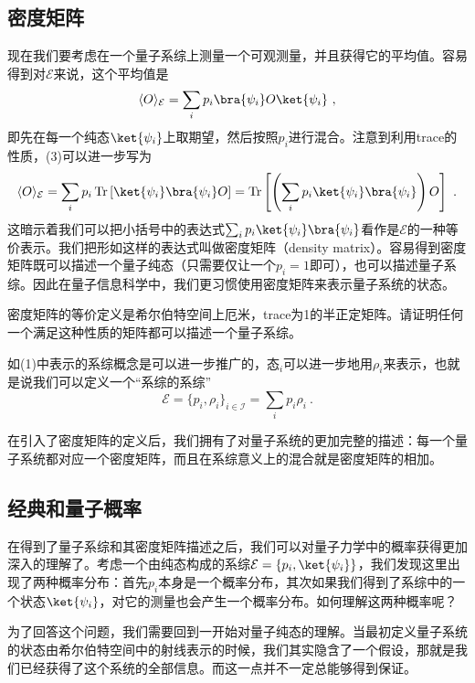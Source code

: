 \subsection{密度矩阵}

现在我们要考虑在一个量子系综上测量一个可观测量，并且获得它的平均值。容易得到对$\mathcal{E}$来说，这个平均值是\begin{equation}
\langle O\rangle_\mathcal{E}=\sum_i p_i\bra{\psi_i}O\ket{\psi_i}~,
\end{equation}
即先在每一个纯态$\ket{\psi_i}$上取期望，然后按照$p_i$进行混合。注意到利用trace的性质，(3)可以进一步写为
\begin{equation}
\langle O\rangle_\mathcal{E}=\sum_i p_i\operatorname{Tr}\left[\ket{\psi_i}\bra{\psi_i}O\right]=\operatorname{Tr}\left[\left(\sum_i p_i\ket{\psi_i}\bra{\psi_i}\right)O\right]~.
\end{equation}
这暗示着我们可以把小括号中的表达式$\sum_i p_i\ket{\psi_i}\bra{\psi_i}$看作是$\mathcal{E}$的一种等价表示。我们把形如这样的表达式叫做密度矩阵（density matrix）。容易得到密度矩阵既可以描述一个量子纯态（只需要仅让一个$p_i=1$即可），也可以描述量子系综。因此在量子信息科学中，我们更习惯使用密度矩阵来表示量子系统的状态。
\begin{exercise}{}
密度矩阵的等价定义是希尔伯特空间上厄米，trace为1的半正定矩阵。请证明任何一个满足这种性质的矩阵都可以描述一个量子系综。
\end{exercise}

如(1)中表示的系综概念是可以进一步推广的，$\text{态}_i$可以进一步地用$\rho_i$来表示，也就是说我们可以定义一个“系综的系综”
\begin{equation}\mathcal{E}=\{p_i,\rho_i\}_{i\in\mathcal{I}}=\sum_i p_i\rho_i~.\end{equation}

在引入了密度矩阵的定义后，我们拥有了对量子系统的更加完整的描述：每一个量子系统都对应一个密度矩阵，而且在系综意义上的混合就是密度矩阵的相加。

\subsection{经典和量子概率}

在得到了量子系综和其密度矩阵描述之后，我们可以对量子力学中的概率获得更加深入的理解了。考虑一个由纯态构成的系综$\mathcal{E}=\{p_i,\ket{\psi_i}\}$，我们发现这里出现了两种概率分布：首先$p_i$本身是一个概率分布，其次如果我们得到了系综中的一个状态$\ket{\psi_i}$，对它的测量也会产生一个概率分布。如何理解这两种概率呢？

为了回答这个问题，我们需要回到一开始对量子纯态的理解。当最初定义量子系统的状态由希尔伯特空间中的射线表示的时候，我们其实隐含了一个假设，那就是我们已经获得了这个系统的全部信息。而这一点并不一定总能够得到保证。

